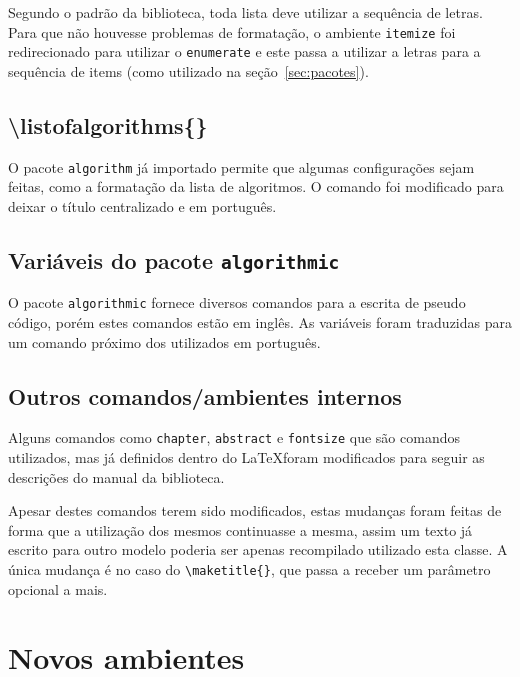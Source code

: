     Segundo o padrão da biblioteca, toda lista deve utilizar a sequência de letras. Para que não houvesse problemas de formatação, o ambiente \verb+itemize+ foi redirecionado para utilizar o \verb+enumerate+ e este passa a utilizar a letras para a sequência de items (como utilizado na seção~\ref{sec:pacotes}).
    
    \subsection{\textbackslash listofalgorithms\{\}}
    
    O pacote \verb+algorithm+ já importado permite que algumas configurações sejam feitas, como a formatação da lista de algoritmos. O comando foi modificado para deixar o título centralizado e em português.
    
    \subsection{Variáveis do pacote \texttt{algorithmic}}
    
    O pacote \verb+algorithmic+ fornece diversos comandos para a escrita de pseudo código, porém estes comandos estão em inglês. As variáveis foram traduzidas para um comando próximo dos utilizados em português.
    
    \subsection{Outros comandos/ambientes internos}
    
    Alguns comandos como \verb+chapter+, \verb+abstract+ e \verb+fontsize+  que são comandos utilizados, mas já definidos dentro do \LaTeX foram modificados para seguir as descrições do manual da biblioteca.

    Apesar destes comandos terem sido modificados, estas mudanças foram feitas de forma que a utilização dos mesmos continuasse a mesma, assim um texto já escrito para outro modelo poderia ser apenas recompilado utilizado esta classe. A única mudança é no caso do \verb+\maketitle{}+, que passa a receber um parâmetro opcional a mais.

\section{Novos ambientes}

